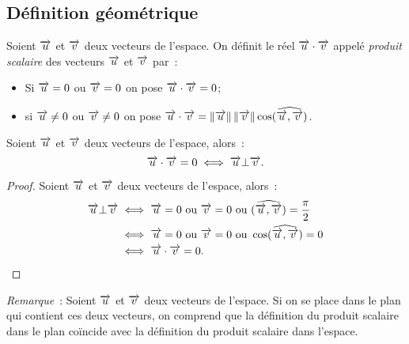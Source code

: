 \subsection{Définition géométrique}
\begin{defdef}
  Soient \(\vu\) et \(\vv\) deux vecteurs de l'espace. On définit le réel \(\vu\cdot\vv\) appelé \emph{produit scalaire} des vecteurs \(\vu\) et \(\vv\) par~:
  \begin{itemize}
  \item Si \(\vu=0\) ou \(\vv=0\) on pose \(\vu\cdot\vv=0\);
  \item si \(\vu\neq 0\) ou \(\vv\neq 0\) on pose \(\vu\cdot\vv=\norme{\vu}\norme{\vv}\cos(\widehat{\vu,\vv})\).
  \end{itemize}
\end{defdef}
\begin{prop}
Soient \(\vu\) et \(\vv\) deux vecteurs de l'espace, alors~:
\begin{equation}
  \vu\cdot\vv=0 \iff \vu \bot \vv.
\end{equation}
\end{prop}
\begin{proof}
  Soient \(\vu\) et \(\vv\) deux vecteurs de l'espace, alors~:
  \begin{align}
    \vu \bot \vv &\iff \vu=0 \text{~ou~} \vv=0 \text{~ou~} (\widehat{\vu,\vv})=\frac{\pi}{2}\\
&\iff \vu=0 \text{~ou~} \vv=0 \text{~ou~} \cos(\widehat{\vu,\vv})=0\\
&\iff \vu\cdot\vv=0.
  \end{align}
\end{proof}

\emph{Remarque}~: Soient \(\vu\) et \(\vv\) deux vecteurs de l'espace. Si on se place dans le plan qui contient ces deux vecteurs, on comprend que la définition du produit scalaire dans le plan coïncide avec la définition du produit scalaire dans l'espace.

